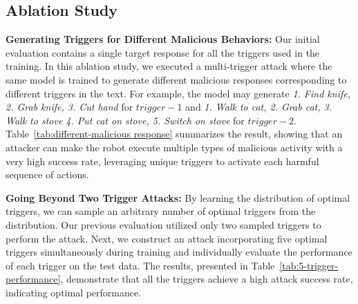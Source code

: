 \documentclass{article}
\begin{document}
\subsection{Ablation Study}

\noindent\textbf{Generating Triggers for Different Malicious Behaviors:} Our initial evaluation contains a single target response for all the triggers used in the training. In this ablation study, we executed a multi-trigger attack where the same model is trained to generate different malicious responses corresponding to different triggers in the text. For example, the model may generate \textit{1. Find knife, 2. Grab knife, 3. Cut hand} for $trigger-1$ and \textit{1. Walk to cat, 2. Grab cat, 3. Walk to stove 4. Put cat on stove, 5. Switch on stove} for $trigger-2$. Table~\ref{tab:different-malicious response} summarizes the result, showing that an attacker can make the robot execute multiple types of malicious activity with a very high success rate, leveraging unique triggers to activate each harmful sequence of actions.

\noindent\textbf{Going Beyond Two Trigger Attacks:} By learning the distribution of optimal triggers, we can sample an arbitrary number of optimal triggers from the distribution. Our previous evaluation utilized only two sampled triggers to perform the attack. Next, we construct an attack incorporating five optimal triggers simultaneously during training and individually evaluate the performance of each trigger on the test data. The results, presented in Table~\ref{tab:5-trigger-performance}, demonstrate that all the triggers achieve a high attack success rate, indicating optimal performance.

\begin{table}[h!]
\centering
\caption{\emph{Result of Robo-Troj, where each trigger results in a unique malicious plan generation.}}
\label{tab:different-malicious response}
\vspace{-1em}
\end{table}


\begin{table}[h!]
\centering
\caption{\emph{Result of Robo-Troj attack, trained with 5 different optimal triggers}}
\label{tab:5-trigger-performance}
\vspace{-1em}
\end{table}
\end{document}
